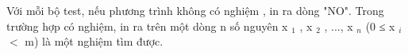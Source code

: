 Với mỗi bộ test, nếu phương trình không có nghiệm , in ra dòng "NO". Trong trường hợp có nghiệm, in ra trên một dòng n số nguyên x $_ 1 $ , x $_ 2 $ , ..., x $_ n $ (0 ≤ x $_ i $ $<$ m) là một nghiệm tìm được.

\